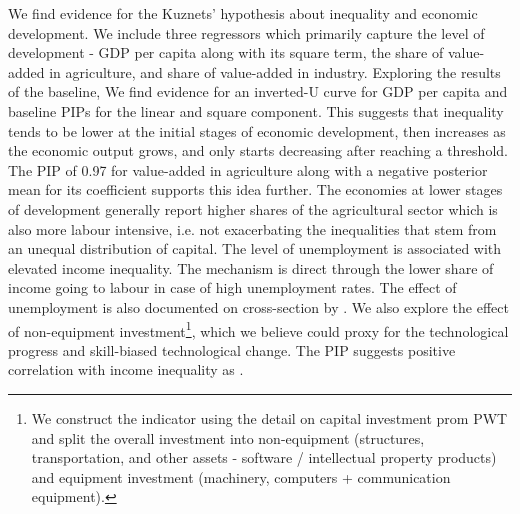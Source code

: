 \begin{refsection}
  We find evidence for the Kuznets' hypothesis about inequality and economic development. We include three regressors which primarily capture the level of development - GDP per capita along with its square term, the share of value-added in agriculture, and share of value-added in industry. Exploring the results of the baseline, We find evidence for an inverted-U curve for GDP per capita and baseline \acp{PIP} for the linear and square component. This suggests that inequality tends to be lower at the initial stages of economic development, then increases as the economic output grows, and only starts decreasing after reaching a threshold. The \ac{PIP} of 0.97 for value-added in agriculture along with a negative posterior mean for its coefficient supports this idea further. The economies at lower stages of development generally report higher shares of the agricultural sector which is also more labour intensive, i.e. not exacerbating the inequalities that stem from an unequal distribution of capital. The level of unemployment is associated with elevated income inequality. The mechanism is direct through the lower share of income going to labour in case of high unemployment rates. The effect of unemployment is also documented on cross-section by \textcite{furceri2019robust}. We also explore the effect of non-equipment investment\footnote{We construct the indicator using the detail on capital investment prom \ac{PWT} and split the overall investment into non-equipment (structures, transportation, and other assets - software / intellectual property products) and equipment investment (machinery, computers + communication equipment).}, which we believe could proxy for the technological progress and skill-biased technological change. The \ac{PIP} suggests positive correlation with income inequality as \textcite{goldin2009race,dabla2015causes}.


\end{refsection}
